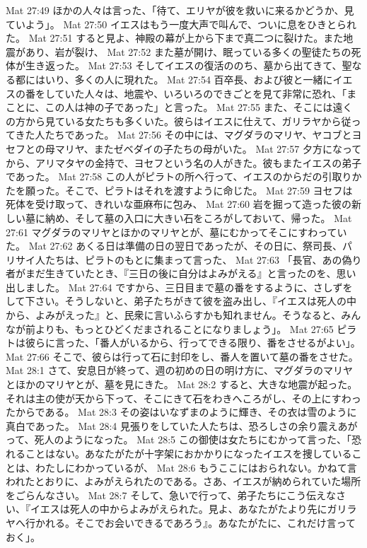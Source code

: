 Mat 27:49  ほかの人々は言った、「待て、エリヤが彼を救いに来るかどうか、見ていよう」。
Mat 27:50  イエスはもう一度大声で叫んで、ついに息をひきとられた。
Mat 27:51  すると見よ、神殿の幕が上から下まで真二つに裂けた。また地震があり、岩が裂け、
Mat 27:52  また墓が開け、眠っている多くの聖徒たちの死体が生き返った。
Mat 27:53  そしてイエスの復活ののち、墓から出てきて、聖なる都にはいり、多くの人に現れた。
Mat 27:54  百卒長、および彼と一緒にイエスの番をしていた人々は、地震や、いろいろのできごとを見て非常に恐れ、「まことに、この人は神の子であった」と言った。
Mat 27:55  また、そこには遠くの方から見ている女たちも多くいた。彼らはイエスに仕えて、ガリラヤから従ってきた人たちであった。
Mat 27:56  その中には、マグダラのマリヤ、ヤコブとヨセフとの母マリヤ、またゼベダイの子たちの母がいた。
Mat 27:57  夕方になってから、アリマタヤの金持で、ヨセフという名の人がきた。彼もまたイエスの弟子であった。
Mat 27:58  この人がピラトの所へ行って、イエスのからだの引取りかたを願った。そこで、ピラトはそれを渡すように命じた。
Mat 27:59  ヨセフは死体を受け取って、きれいな亜麻布に包み、
Mat 27:60  岩を掘って造った彼の新しい墓に納め、そして墓の入口に大きい石をころがしておいて、帰った。
Mat 27:61  マグダラのマリヤとほかのマリヤとが、墓にむかってそこにすわっていた。
Mat 27:62  あくる日は準備の日の翌日であったが、その日に、祭司長、パリサイ人たちは、ピラトのもとに集まって言った、
Mat 27:63  「長官、あの偽り者がまだ生きていたとき、『三日の後に自分はよみがえる』と言ったのを、思い出しました。
Mat 27:64  ですから、三日目まで墓の番をするように、さしずをして下さい。そうしないと、弟子たちがきて彼を盗み出し、『イエスは死人の中から、よみがえった』と、民衆に言いふらすかも知れません。そうなると、みんなが前よりも、もっとひどくだまされることになりましょう」。
Mat 27:65  ピラトは彼らに言った、「番人がいるから、行ってできる限り、番をさせるがよい」。
Mat 27:66  そこで、彼らは行って石に封印をし、番人を置いて墓の番をさせた。
Mat 28:1  さて、安息日が終って、週の初めの日の明け方に、マグダラのマリヤとほかのマリヤとが、墓を見にきた。
Mat 28:2  すると、大きな地震が起った。それは主の使が天から下って、そこにきて石をわきへころがし、その上にすわったからである。
Mat 28:3  その姿はいなずまのように輝き、その衣は雪のように真白であった。
Mat 28:4  見張りをしていた人たちは、恐ろしさの余り震えあがって、死人のようになった。
Mat 28:5  この御使は女たちにむかって言った、「恐れることはない。あなたがたが十字架におかかりになったイエスを捜していることは、わたしにわかっているが、
Mat 28:6  もうここにはおられない。かねて言われたとおりに、よみがえられたのである。さあ、イエスが納められていた場所をごらんなさい。
Mat 28:7  そして、急いで行って、弟子たちにこう伝えなさい、『イエスは死人の中からよみがえられた。見よ、あなたがたより先にガリラヤへ行かれる。そこでお会いできるであろう』。あなたがたに、これだけ言っておく」。
